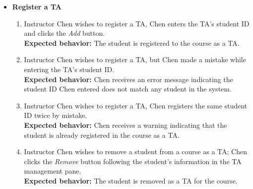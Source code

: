 \begin{itemize}
    \item \textbf{Register a TA} \begin{enumerate}
        \item Instructor Chen wishes to register a TA, Chen enters the TA's
            student ID and clicks the \emph{Add} button. \\
        {\bf Expected behavior:} The student is registered to the course as a
            TA.

        \item Instructor Chen wishes to register a TA, but Chen made a mistake while
            entering the TA's student ID. \\
        {\bf Expected behavior:} Chen receives an error message indicating the
            student ID Chen entered does not match any student in the system.

        \item Instructor Chen wishes to register a TA, Chen registers the same
            student ID twice by mistake. \\
        {\bf Expected behavior:} Chen receives a warning indicating that the
            student is already registered in the course as a TA.

        \item Instructor Chen wishes to remove a student from a course as a TA;
            Chen clicks the \emph{Remove} button following the student's information
            in the TA management pane. \\
        {\bf Expected behavior:} The student is removed as a TA for the course.
    \end{enumerate}
\end{itemize}

